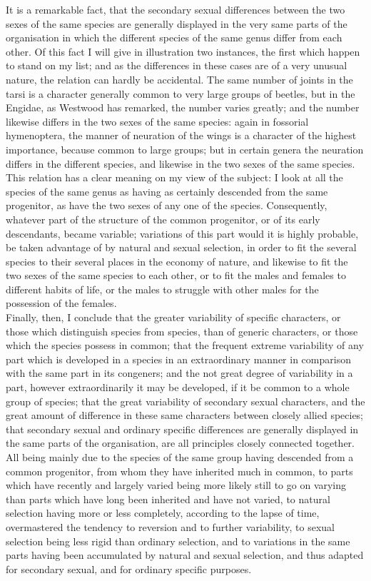 \indent It is a remarkable fact, that the secondary sexual differences between the two sexes of the same species are generally displayed in the very same parts of the organisation in which the different species of the same genus differ from each other. Of this fact I will give in illustration two instances, the first which happen to stand on my list; and as the differences in these cases are of a very unusual nature, the relation can hardly be accidental. The same number of joints in the tarsi is a character generally common to very large groups of beetles, but in the Engidae, as Westwood has remarked, the number varies greatly; and the number likewise differs in the two sexes of the same species: again in fossorial hymenoptera, the manner of neuration of the wings is a character of the highest importance, because common to large groups; but in certain genera the neuration differs in the different species, and likewise in the two sexes of the same species. This relation has a clear meaning on my view of the subject: I look at all the species of the same genus as having as certainly descended from the same progenitor, as have the two sexes of any one of the species. Consequently, whatever part of the structure of the common progenitor, or of its early descendants, became variable; variations of this part would it is highly probable, be taken advantage of by natural and sexual selection, in order to fit the several species to their several places in the economy of nature, and likewise to fit the two sexes of the same species to each other, or to fit the males and females to different habits of life, or the males to struggle with other males for the possession of the females.\\
\indent Finally, then, I conclude that the greater variability of specific characters, or those which distinguish species from species, than of generic characters, or those which the species possess in common; that the frequent extreme variability of any part which is developed in a species in an extraordinary manner in comparison with the same part in its congeners; and the not great degree of variability in a part, however extraordinarily it may be developed, if it be common to a whole group of species; that the great variability of secondary sexual characters, and the great amount of difference in these same characters between closely allied species; that secondary sexual and ordinary specific differences are generally displayed in the same parts of the organisation, are all principles closely connected together. All being mainly due to the species of the same group having descended from a common progenitor, from whom they have inherited much in common, to parts which have recently and largely varied being more likely still to go on varying than parts which have long been inherited and have not varied, to natural selection having more or less completely, according to the lapse of time, overmastered the tendency to reversion and to further variability, to sexual selection being less rigid than ordinary selection, and to variations in the same parts having been accumulated by natural and sexual selection, and thus adapted for secondary sexual, and for ordinary specific purposes.\\

